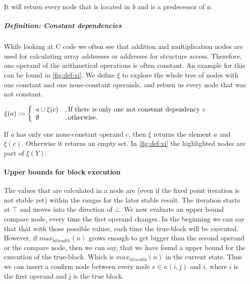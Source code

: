 It will return every node that is located in \textit{b} and is a predecessor of \textit{a}.

\subparagraph{Definition: Constant dependencies}

While looking at C code we often see that addition and multiplication nodes are used for calculating array addresses or addresses for structure access. Therefore, one operand of the arithmetical operations is often constant. An example for this can be found in \autoref{fig:def:xi}.
We define $\xi$ to explore the whole tree of nodes with one constant and one none-constant operands, and return us every node that was not constant.
\begin{center}
$\xi(a) := 
\left\{
	\begin{array}{l}
		a \cup \xi(c)\\ 
		\emptyset
	\end{array}
	\begin{array}{l}
		, \text{If there is only one not constant dependency \textit{c}} \\ 
		, \text{otherwise}.
	\end{array}
\right.$
\end{center}

If \textit{a} has only one none-constant operand c, then $\xi$ returns the element $a$ and $\xi(c)$. Otherwise it returns an empty set. In \autoref{fig:def:xi} the highlighted nodes are part of $\xi(Y)$.

\paragraph{Upper bounds for block execution}
The values that are calculated in a node are (even if the fixed point iteration is not stable yet) within the ranges for the later stable result. The iteration starts at $\top$ and moves into the direction of $\bot$. 
We now evaluate an upper bound compare node, every time the first operand changes. In the beginning we can say that that with those possible values, each time the true-block will be executed. However, if $max_{bitwidth}(n)$ grows enough to get bigger than the second operand or the compare node, then we can say, that we have found a upper bound for the execution of the true-block. Which is $max _{bitwidth}(n)$ in the current state. Thus we can insert a confirm node between every node $e \in \kappa(i, j)$ and $i$, where $i$ is the first operand and j is the true block.
\label{upper_bound_insert_confirm}

